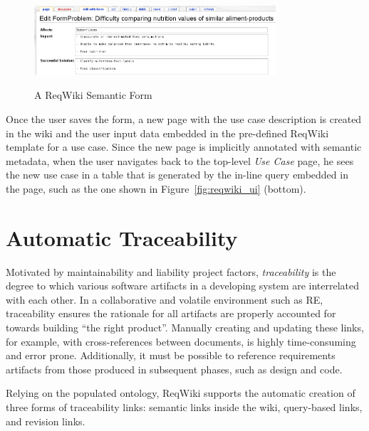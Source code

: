 \documentclass[10pt,twoside,openany,bibtotoc,liststotoc]{scrbook}
\newcommand{\blankline}{\vspace{5mm}}
\begin{document}
\begin{figure}[!ht]
  \centering
  \includegraphics[width=0.8\textwidth]{reqwiki-forms}\\
  \caption{A ReqWiki Semantic Form}
  \label{fig:form}
\end{figure}

Once the user saves the form, a new page with the use case description is created in the wiki and the user input data embedded in the pre-defined ReqWiki template for a use case. Since the new page is implicitly annotated with semantic metadata, when the user navigates back to the top-level \emph{Use Case} page, he sees the new use case in a table that is generated by the in-line query embedded in the page, such as the one shown in Figure~\ref{fig:reqwiki_ui} (bottom).



\section{Automatic Traceability}

Motivated by maintainability and liability project factors,
\emph{traceability} is the degree to which various software artifacts in a
developing system are interrelated with each other.  In a collaborative and volatile environment such as RE, traceability ensures the rationale for all artifacts are properly accounted for towards building ``the right product''.  Manually creating and updating these links, for example, with cross-references between documents, is highly time-consuming and error prone.  Additionally, it must be possible to reference requirements artifacts from those produced in subsequent phases, such as design and code.

\blankline
Relying on the populated ontology, ReqWiki supports the automatic creation of three forms of traceability links: semantic links inside the wiki, query-based links, and revision links.
\end{document}

